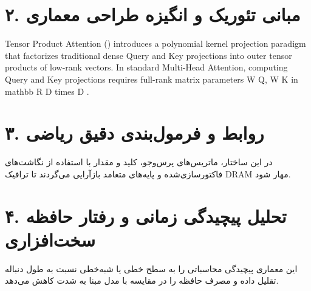 \documentclass[12pt,a4paper]{article}
\begin{document}
\section*{۲. مبانی تئوریک و انگیزه طراحی معماری}
Tensor Product Attention () introduces a polynomial kernel projection paradigm that factorizes traditional dense Query and Key projections into outer tensor products of low-rank vectors. In standard Multi-Head Attention, computing Query and Key projections requires full-rank matrix parameters W Q, W K in mathbb R D times D .

\section*{۳. روابط و فرمول‌بندی دقیق ریاضی}
در این ساختار، ماتریس‌های پرس‌وجو، کلید و مقدار با استفاده از نگاشت‌های فاکتورسازی‌شده و پایه‌های متعامد بازآرایی می‌گردند تا ترافیک DRAM مهار شود.

\section*{۴. تحلیل پیچیدگی زمانی و رفتار حافظه سخت‌افزاری}
این معماری پیچیدگی محاسباتی را به سطح خطی یا شبه‌خطی نسبت به طول دنباله تقلیل داده و مصرف حافظه را در مقایسه با مدل مبنا به شدت کاهش می‌دهد.
\end{document}
